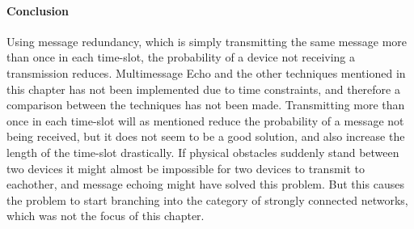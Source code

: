 \paragraph{Conclusion}
Using message redundancy, which is simply transmitting the same message more than once in each time-slot, the probability of a device not receiving a transmission reduces.
Multimessage Echo and the other techniques mentioned in this chapter has not been implemented due to time constraints, and therefore a comparison between the techniques has not been made.
Transmitting more than once in each time-slot will as mentioned reduce the probability of a message not being received, but it does not seem to be a good solution, and also increase the length of the time-slot drastically.
If physical obstacles suddenly stand between two devices it might almost be impossible for two devices to transmit to eachother, and message echoing might have solved this problem.
But this causes the problem to start branching into the category of strongly connected networks, which was not the focus of this chapter.